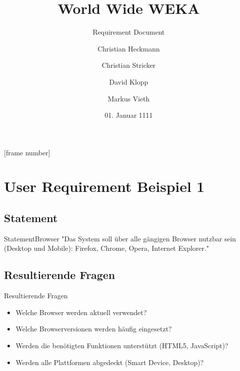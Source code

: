 \documentclass{beamer}
\title[WWWEKA]{World Wide WEKA}
\subtitle{Requirement Document}
\author[C. Heckmann\and C. Stricker\and D. Klopp\and M. Vieth]{Christian Heckmann\and Christian Stricker\and David Klopp\and Markus Vieth}
\date[01.01.1111]{01. Januar 1111}
\begin{document}
	
	\frame{
		\titlepage
	}
	[frame number]
	
	
	\section[UR 1]{User Requirement Beispiel 1}
	\subsection[Statement]{Statement}
	\begin{frame}{Statement}{Browser}
		"Das System soll über alle gängigen Browser nutzbar sein (Desktop und Mobile): Firefox, Chrome, Opera, Internet Explorer."
	\end{frame}
	
	\subsection[Resultierende Fragen]{Resultierende Fragen}
	\begin{frame}[<+->][t]{Resultierende Fragen}
		\begin{itemize}		
			\item Welche Browser werden aktuell verwendet?
			\item Welche Browserversionen werden häufig eingesetzt?
			\item Werden die benötigten Funktionen unterstützt (HTML5, JavaScript)?
			\item Werden alle Plattformen abgedeckt (Smart Device, Desktop)?
		\end{itemize}
	\end{frame}
	
\end{document}
